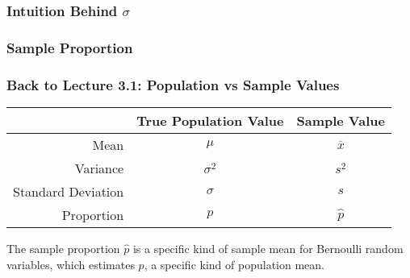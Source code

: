\documentclass[slides]{beamer}
\newcommand{\blue}[1]{\textcolor{blue2}{#1}}
\begin{document}
\begin{frame}[fragile]
\frametitle{Intuition Behind $\sigma$}


\end{frame}


\begin{frame}[fragile]
\frametitle{Sample Proportion}

%
%
%
%

\end{frame}


\begin{frame}[fragile]
\frametitle{Back to Lecture 3.1: Population vs Sample Values}

\begin{center}
  \begin{tabular}{r|cc}
	\hline	
     & True Population Value & Sample Value \\ 
	\hline	
    Mean & $\mu$ & $\overline{x}$ \\ 
    Variance & $\sigma^2$ & $s^2$ \\ 
    Standard Deviation & $\sigma$ & $s$ \\ 
    \blue{Proportion} & \blue{$p$} & \blue{$\widehat{p}$} \\
	\hline	
  \end{tabular}
\end{center}

\vspace{0.5cm}

\pause The \blue{sample proportion $\widehat{p}$} is a specific kind of \blue{sample mean} for Bernoulli random variables, which \blue{estimates $p$}, a specific kind of population mean.  

\end{frame}
\end{document}
